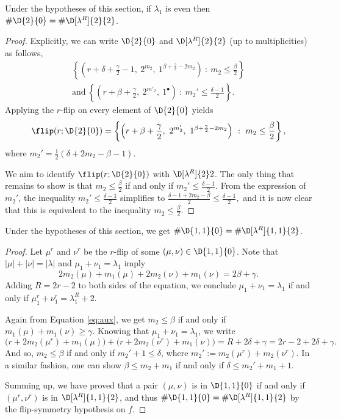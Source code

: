 \documentclass[twoside]{article}
\begin{document}
\begin{lem}\label{A.1=A^r.2}
Under the hypotheses of this section, if $\lambda_1$ is even then $\#\D{2}{0}=\#\D[\lambda^R]{2}{2}$.
\end{lem}
\begin{proof}
Explicitly, we can write $\D{2}{0}$ and $\D[\lambda^R]{2}{2}$ (up to multiplicities) as follows,
\begin{gather*} %
    \left\{ \left( r + \delta + \frac{\gamma}{2} - 1, \ 2^{m_2},\ 1^{\beta+\frac{\gamma}{2}-2m_2}\right)\ :\ m_2\le\frac{\beta}{2}\right\}
    \\ \text{and}\
    \left\{ \left( r + \beta + \frac{\gamma}{2}, \ 2^{m'_2},\ 1^{\bullet}\right)\ :\ m_2'\le\frac{\delta-1}{2}\right\}.
\end{gather*}
Applying the $r$-flip on every element of $\D{2}{0}$ yields
\[
\flip(r;\D{2}{0}) = \left\{ \left( r + \beta + \frac{\gamma}{2}, \ 2^{m_2'},\ 1^{\beta+\frac{\gamma}{2}-2m_2}\right)\ :\ m_2\le\frac{\beta}{2}\right\}, \]
where \(m_2'=\frac{1}{2}(\delta+2m_2-\beta-1)\).

We aim to identify $\flip(r;\D{2}{0})$ with $\D[\lambda^R]{2}2$. The only thing that remains to show is that $m_2\le\frac{\beta}{2}$ if and only if $m_2'\le\frac{\delta-1}{2}$.
From the expression of $m_2'$, the inequality $m_2'\le\frac{\delta-1}{2}$ simplifies to
$\frac{{\delta-1}+2m_2-\beta}{2}\le{\frac{\delta-1}{2}},$
and it is now clear that this is equivalent to the inequality $m_2\le\frac{\beta}{2}$.
\end{proof} %

\begin{lem}\label{B.1=B^r.2}
Under the hypotheses of this section, we get $\#\D{1,1}{0}=\#\D[\lambda^R]{1,1}{2}$.
\end{lem}
\begin{proof}
Let $\mu^r$ and $\nu^r$ be the $r$-flip of some $(\mu,\nu)\in\D{1,1}{0}$. Note that $|\mu|+|\nu|=|\lambda|$ and $\mu_1+\nu_1=\lambda_1$ imply
\begin{equation}\label{eq:aux}
2m_2(\mu) + m_1(\mu) +  2m_2(\nu) + m_1(\nu) = 2\beta +\gamma.    
\end{equation}
Adding $R=2r-2$ to both sides of the equation, we conclude $\mu_1+\nu_1 = \lambda_1$ if and only if $\mu^r_1+\nu^r_1 = \lambda^R_1+2$.

Again from Equation \eqref{eq:aux}, we get $m_2\le\beta$ if and only if $m_1(\mu)+m_1(\nu)\ge\gamma$.
Knowing that $\mu_1+\nu_1=\lambda_1$, we write
\[\big(r+2m_2(\mu^r)+m_1(\mu)\big)+\big(r+2m_2(\nu^r)+m_1(\nu)\big) = R + 2\delta + \gamma = 2r-2+2\delta+\gamma.
\]
And so, $m_2\le\beta$ if and only if $m_2' + 1 \le \delta$, where $m_2':=m_2(\mu^r)+m_2(\nu^r)$.
In a similar fashion, one can show $\beta\le m_2+m_1$ if and only if $\delta\le m_2'+m_1+1.$


Summing up, we have proved that a pair $(\mu,\nu)$ is in $\D{1,1}{0}$ if and only if $(\mu^r,\nu^r)$ is in $\D[\lambda^R]{1,1}{2}$, and thus $\#\D{1,1}{0}=\#\D[\lambda^R]{1,1}{2}$ by the flip-symmetry hypothesis on $f$.
\end{proof}
\end{document}
